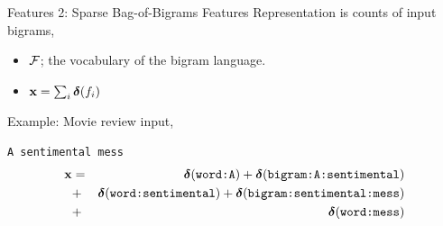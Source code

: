 \documentclass{beamer}
\begin{document}
\begin{frame}{Features 2: Sparse Bag-of-Bigrams Features}
  Representation is counts of input bigrams, 
  \begin{itemize}
  \item $\mathcal{F}$; the vocabulary of the bigram language.
  \item $\mathbf{x} = \sum_{i} \boldsymbol{\delta}(f_i)$ 
  \end{itemize}

  Example: Movie review input, 
  \begin{center}
    \texttt{A sentimental mess}
    \begin{eqnarray*}
      \mathbf{x} &=& \boldsymbol{\delta}(\texttt{word:A})+ \boldsymbol{\delta}(\texttt{bigram:A:sentimental}) \\
      &+&  \boldsymbol{\delta}(\texttt{word:sentimental}) +   \boldsymbol{\delta}(\texttt{bigram:sentimental:mess})  \\
      &+& \boldsymbol{\delta}(\texttt{word:mess})
    \end{eqnarray*}

    
  \end{center}
\end{frame}
\end{document}
